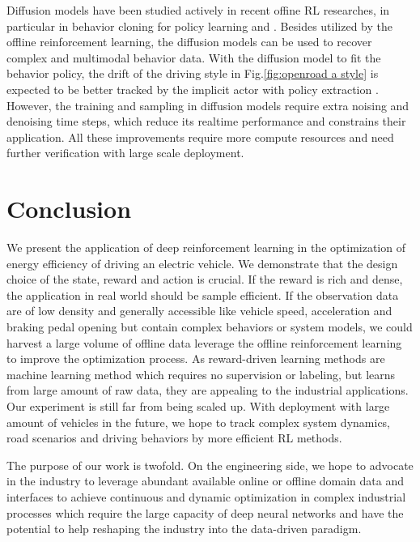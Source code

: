 \documentclass{article}
\begin{document}
Diffusion models have been studied actively in recent offine RL researches, in particular in behavior cloning for policy learning \parencite{janner22:_plann_diffus_flexib_behav_synth} \parencite{wang22:_diffus_polic_expres_polic_class} and \parencite{hansen-estruch23:_idql} \parencite{psenka23:_learn_diffus_model_polic_rewar}. Besides utilized by the offline reinforcement learning, the diffusion models can be used to recover complex and multimodal behavior data. With the diffusion model to fit the behavior policy, the drift of the driving style in Fig.\@\ref{fig:openroad a style} is expected to be better tracked by the implicit actor with policy extraction \parencite{hansen-estruch23:_idql}. However, the training and sampling in diffusion models require extra noising and denoising time steps, which reduce its realtime performance and constrains their application. All these improvements require more compute resources and need further verification with large scale deployment.

\section{Conclusion}\label{sec:conclusion}

We present the application of deep reinforcement learning in the optimization of energy efficiency of driving an electric vehicle. We demonstrate that the design choice of the state, reward and action is crucial. If the reward is rich and dense, the application in real world should be sample efficient. If the observation data are of low density and generally accessible like vehicle speed, acceleration and braking pedal opening but contain complex behaviors or system models, we could harvest a large volume of offline data leverage the offline reinforcement learning to improve the optimization process. As reward-driven learning methods are machine learning method which requires no supervision or labeling, but learns from large amount of raw data, they are appealing to the industrial applications. Our experiment is still far from being scaled up. With deployment with large amount of vehicles in the future, we hope to track complex system dynamics, road scenarios and driving behaviors by more efficient RL methods.

The purpose of our work is twofold. On the engineering side, we hope to advocate in the industry to leverage abundant available online or offline domain data and interfaces to achieve continuous and dynamic optimization in complex industrial processes which require the large capacity of deep neural networks and have the potential to help reshaping the industry into the data-driven paradigm.
\end{document}
